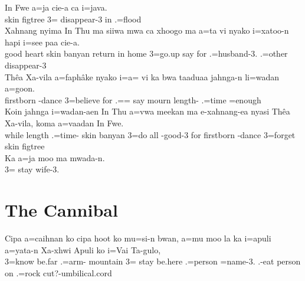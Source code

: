 \ea
\gll In Fwe a=ja cie-a ca i=java.\\ skin figtree 3= disappear-3 in .=flood\\ \glt {} 
\ex
\gll Xahnang nyima In Thu ma siiwa mwa ca xhoogo ma a=ta vi nyako i=xatoo-n hapi i=see paa cie-a.\\ good heart skin banyan  return  in home  3=go.up say for .=husband-3.  .=other  disappear-3\\ \glt {} 
\ex
\gll Thêa Xa-vila a=faphâke nyako i=a= vi ka bwa taaduaa jahnga-n li=wadan a=goon.\\ firstborn -dance 3=believe for .== say   mourn length- .=time =enough\\ \glt  {}
\ex
\gll Koin jahnga i=wadan-aen In Thu a=vwa meekan ma e-xahnang-ea nyasi Thêa Xa-vila, koma a=vaadan In Fwe.\\ while length .=time- skin banyan 3=do all  -good-3 for firstborn -dance  3=forget skin figtree\\ \glt  {}
\ex
\gll Ka a=ja moo ma mwada-n.\\  3= stay  wife-3.\\ \glt  {}
\z

\section{The Cannibal}\largerpage[2]

\ea
\gll Cipa a=caihnan ko cipa hoot ko mu=si-n bwan, a=mu moo la ka i=apuli a=yata-n Xa-xhwi Apuli ko i=Vai Ta-gulo,\\  3=know   be.far  .=arm- mountain 3= stay be.here  .=person =name-3. .-eat person on .=rock cut?-umbilical.cord\\ \glt {}
\z

